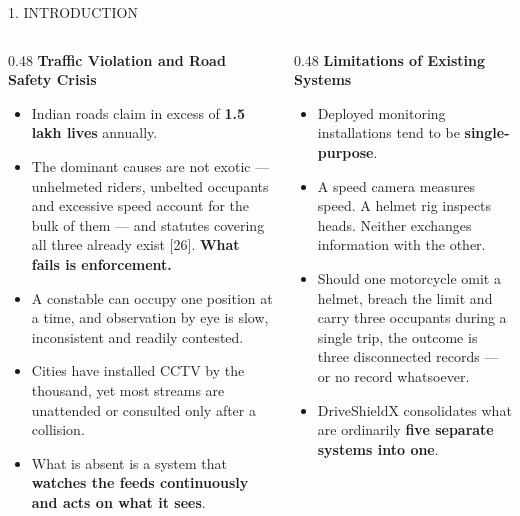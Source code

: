 \documentclass[aspectratio=169,10pt,t]{beamer}
\newcommand{\hd}[1]{{\color{dsblue}\textbf{#1}}}          %
\begin{document}
\begin{frame}{1. INTRODUCTION}
\footnotesize
\begin{columns}[T,onlytextwidth]
\begin{column}{0.48\textwidth}
\hd{Traffic Violation and Road Safety Crisis}
\begin{itemize}\setlength{\itemsep}{0.3em}
  \item Indian roads claim in excess of \textbf{1.5 lakh lives} annually.
  \item The dominant causes are not exotic --- unhelmeted riders, unbelted occupants and excessive speed account for
        the bulk of them --- and statutes covering all three already exist [26]. \textbf{What fails is enforcement.}
  \item A constable can occupy one position at a time, and observation by eye is slow, inconsistent and readily contested.
  \item Cities have installed CCTV by the thousand, yet most streams are unattended or consulted only after a collision.
  \item What is absent is a system that \textbf{watches the feeds continuously and acts on what it sees}.
\end{itemize}
\end{column}
\begin{column}{0.48\textwidth}
\hd{Limitations of Existing Systems}
\begin{itemize}\setlength{\itemsep}{0.3em}
  \item Deployed monitoring installations tend to be \textbf{single-purpose}.
  \item A speed camera measures speed. A helmet rig inspects heads. Neither exchanges information with the other.
  \item Should one motorcycle omit a helmet, breach the limit and carry three occupants during a single trip, the
        outcome is three disconnected records --- or no record whatsoever.
  \item DriveShieldX consolidates what are ordinarily \textbf{five separate systems into one}.
\end{itemize}
\end{column}
\end{columns}
\end{frame}
\end{document}
